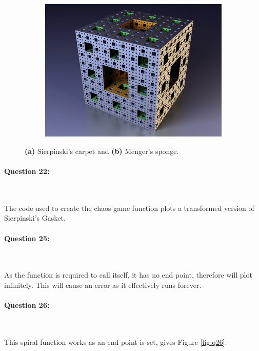 \documentclass{article}
\begin{document}
\begin{figure}[H]
\begin{subfigure}[t]{0.5\linewidth}
			\includegraphics[width=\linewidth]{../Data/menger_sponge.jpg}
			\caption{}
		\end{subfigure}
		\caption{\textbf{(a)} Sierpinski's carpet and \textbf{(b)} Menger's sponge.}
		\label{fig:qu21} 
	\end{figure}

\paragraph{Question 22:}\

\noindent \newline The code used to create the chaos game function plots a transformed version of Sierpinski's Gasket.

\paragraph{Question 25:}\

\noindent \newline As the function is required to call itself, it has no end point, therefore will plot infinitely. This will cause an error as it effectively runs forever.

\newpage
\paragraph{Question 26:}\

\noindent \newline This spiral function works as an end point is set, gives Figure \ref{fig:q26}.
\end{document}
